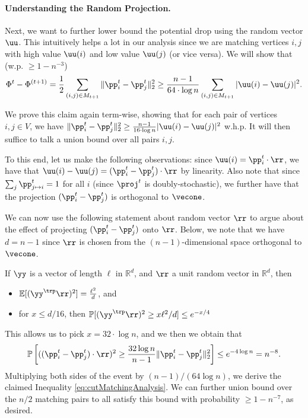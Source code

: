 \paragraph{Understanding the Random Projection.} Next, we want to further lower bound the potential drop using the random vector $\uu$. This intuitively helps a lot in our analysis since we are matching vertices $i,j$ with high value $\uu(i)$ and low value $\uu(j)$ (or vice versa). We will show that (w.p. $\geq 1-n^{-3}$)
\begin{align}\label{eq:cutMatchingAnalysis}
     \Phi^{t} - \Phi^{(t+1)} = \frac{1}{2} \sum_{(i,j) \in M_{t+1}} \|\pp_{i}^t - \pp_{j}^t \|_2^2 \geq \frac{n-1}{64 \cdot \log n} \sum_{(i,j) \in M_{t+1}} |\uu(i) - \uu(j)|^2.
\end{align}

We prove this claim again term-wise, showing that for each pair of vertices $i,j \in V$, we have $\|\pp_{i}^t - \pp_{j}^t \|_2^2 \geq \frac{n-1}{16 \cdot \log n} |\uu(i) - \uu(j)|^2$ w.h.p. It will then suffice to talk a union bound over all pairs $i,j$. 

To this end, let us make the following observations: since $\uu(i) = \pp_i^t \cdot \rr$, we have that $\uu(i) - \uu(j) = (\pp_i^t - \pp_j^t) \cdot \rr$ by linearity. Also note that since $\sum_j \pp_{j \mapsto i}^t = 1$ for all $i$ (since $\proj^t$ is doubly-stochastic), we further have that the projection $(\pp_i^t - \pp_j^t)$ is orthogonal to $\vecone$.

We can now use the following statement about random vector $\rr$ to argue about the effect of projecting $(\pp_i^t - \pp_j^t)$ onto $\rr$. Below, we note that we have $d = n-1$ since $\rr$ is chosen from the $(n-1)$-dimensional space orthogonal to $\vecone$.

\begin{theorem}\label{thm:factsGaussianAnnulus}
If $\yy$ is a vector of length $\ell$ in $\mathbb{R}^d$, and $\rr$ a unit random vector in $\mathbb{R}^d$, then
\begin{itemize}
    \item $\mathbb{E}[(\yy^\trp \rr)^2] = \frac{\ell^2}{d}$, and
    \item for $x \leq d/16$, then $\mathbb{P}[(\yy^\trp \rr)^2 \geq x\ell^2/d] \leq e^{-x/4}$
\end{itemize}
\end{theorem}

This allows us to pick $x = 32 \cdot \log n$, and we then we obtain that
\begin{equation}\label{eq:highProbEventCutMatching}
    \mathbb{P}\left[ ((\pp_i^t - \pp_j^t) \cdot \rr)^2 \geq  \frac{32 \log n}{n-1} \|\pp_i^t - \pp_j^t\|_2^2\right] \leq e^{-4 \log n} = n^{-8}.
\end{equation}
Multiplying both sides of the event by $(n-1)/(64 \log n)$, we derive the claimed Inequality  \eqref{eq:cutMatchingAnalysis}. We can further union bound over the $n/2$ matching pairs to all satisfy this bound with probability $\geq 1-n^{-7}$, as desired.

